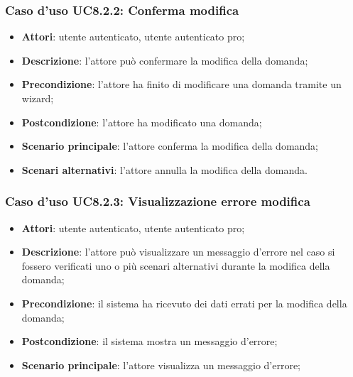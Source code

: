 	\subsubsection{Caso d'uso UC8.2.2: Conferma modifica}
	\begin{itemize}
		\item
			\textbf{Attori}: utente autenticato, utente autenticato pro;
		\item
			\textbf{Descrizione}: l'attore può confermare la modifica della domanda;
		\item		
			\textbf{Precondizione}: l'attore ha finito di modificare una domanda tramite un wizard;
		\item
			\textbf{Postcondizione}: l'attore ha modificato una domanda;
		\item
			\textbf{Scenario principale}: l'attore conferma la modifica della domanda;		
		\item
	 		\textbf{Scenari alternativi}: l'attore annulla la modifica della domanda.
	\end{itemize}		
	\subsubsection{Caso d'uso UC8.2.3: Visualizzazione errore modifica}
	\begin{itemize}
		\item
			\textbf{Attori}: utente autenticato, utente autenticato pro;
		\item
			\textbf{Descrizione}: l'attore può visualizzare un messaggio d'errore nel caso si fossero verificati uno o più scenari alternativi durante la modifica della domanda;
		\item		
			\textbf{Precondizione}: il sistema ha ricevuto dei dati errati per la modifica della domanda;
		\item
			\textbf{Postcondizione}: il sistema mostra un messaggio d'errore;
		\item
			\textbf{Scenario principale}: l'attore visualizza un messaggio d'errore;	
	\end{itemize}	